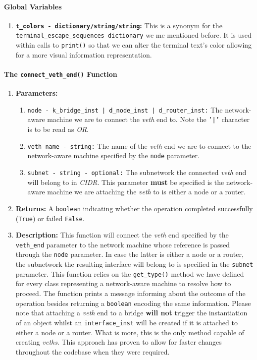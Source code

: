    \paragraph{Global Variables}
        \begin{enumerate}
            \item \textbf{\texttt{\allowbreak t\_colors - dictionary/string/string}:} This is a synonym for the \texttt{\allowbreak terminal\_escape\_sequences dictionary} we me mentioned before. It is used within calls to \texttt{print()} so that we can alter the terminal text's color allowing for a more visual information representation.
        \end{enumerate}

    \paragraph{The \texttt{connect\_veth\_end()} Function}
        \begin{enumerate}
            \item \textbf{Parameters:}
            \begin{enumerate}
                \item \texttt{node - k\_bridge\_inst | d\_node\_inst | d\_router\_inst:} The network-aware machine we are to connect the \textit{veth} end to. Note the \texttt{'|'} character is to be read as \textit{OR}.
                \item \texttt{veth\_name - string:} The name of the \textit{veth} end we are to connect to the network-aware machine specified by the \texttt{node} parameter.
                \item \texttt{subnet - string - optional:} The subnetwork the connected \textit{veth} end will belong to in \textit{CIDR}. This parameter \textbf{must} be specified is the network-aware machine we are attaching the \textit{veth} to is either a node or a router.
            \end{enumerate}
            \item \textbf{Returns:} A \texttt{boolean} indicating whether the operation completed successfully (\texttt{True}) or failed \texttt{False}.
            \item \textbf{Description:} This function will connect the \textit{veth} end specified by the \texttt{veth\_end} parameter to the network machine whose reference is passed through the \texttt{node} parameter. In case the latter is either a node or a router, the subnetwork the resulting interface will belong to is specified in the \texttt{subnet} parameter. This function relies on the \texttt{get\_type()} method we have defined for every class representing a network-aware machine to resolve how to proceed. The function prints a message informing about the outcome of the operation besides returning a \texttt{boolean} encoding the same information. Please note that attaching a \textit{veth} end to a bridge \textbf{will not} trigger the instantiation of an object whilst an \texttt{interface\_inst} will be created if it is attached to either a node or a router. What is more, this is the only method capable of creating \textit{veths}. This approach has proven to allow for faster changes throughout the codebase when they were required.
        \end{enumerate}